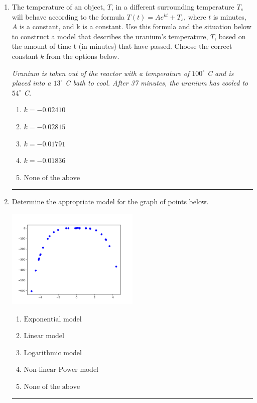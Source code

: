 \documentclass[14pt]{extbook}
\newcommand{\litem}[1]{\item#1\hspace*{-1cm}\rule{\textwidth}{0.4pt}}
\begin{document}
\begin{enumerate}
{\begin{enumerate}[label=\Alph*.]
\end{enumerate} }
\litem{
The temperature of an object, $T$, in a different surrounding temperature $T_s$ will behave according to the formula $T(t) = Ae^{kt} + T_s$, where $t$ is minutes, $A$ is a constant, and k is a constant. Use this formula and the situation below to construct a model that describes the uranium's temperature, $T$, based on the amount of time t (in minutes) that have passed. Choose the correct constant $k$ from the options below.
\begin{center}
    \textit{ Uranium is taken out of the reactor with a temperature of $100^{\circ}$ C and is placed into a $13^{\circ}$ C bath to cool. After 37 minutes, the uranium has cooled to $54^{\circ}$ C. }
\end{center}
\begin{enumerate}[label=\Alph*.]
\item \( k = -0.02410 \)
\item \( k = -0.02815 \)
\item \( k = -0.01791 \)
\item \( k = -0.01836 \)
\item \( \text{None of the above} \)

\end{enumerate} }
\litem{
Determine the appropriate model for the graph of points below.
\begin{center}
    \includegraphics[width=0.5\textwidth]{../Figures/identifyModelGraph11CopyB.png}
\end{center}
\begin{enumerate}[label=\Alph*.]
\item \( \text{Exponential model} \)
\item \( \text{Linear model} \)
\item \( \text{Logarithmic model} \)
\item \( \text{Non-linear Power model} \)
\item \( \text{None of the above} \)


\end{enumerate}}
\end{enumerate}
\end{document}
